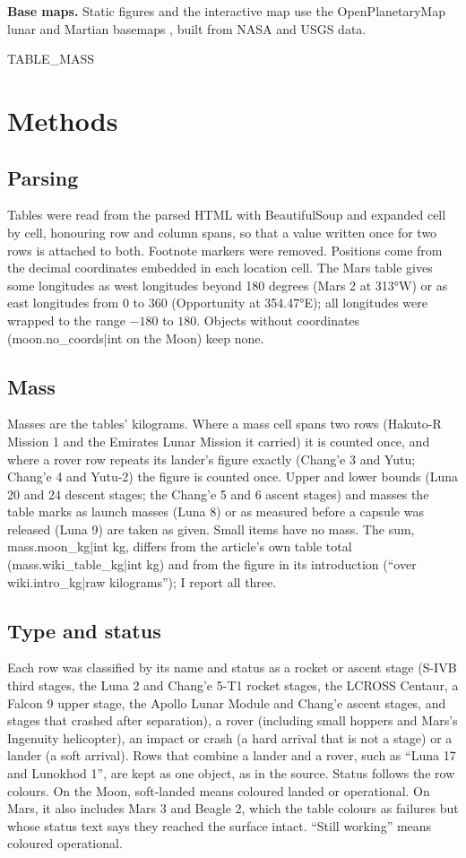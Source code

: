 \documentclass[11pt,a4paper]{article}
\begin{document}
\textbf{Base maps.} Static figures and the interactive map use the OpenPlanetaryMap lunar and Martian basemaps \citep{opm}, built from NASA and USGS data.

{{TABLE_MASS}}

\section{Methods}
\subsection{Parsing}
Tables were read from the parsed HTML with BeautifulSoup and expanded cell by cell, honouring row and column spans, so that a value written once for two rows is attached to both. Footnote markers were removed. Positions come from the decimal coordinates embedded in each location cell. The Mars table gives some longitudes as west longitudes beyond 180 degrees (Mars 2 at 313°W) or as east longitudes from 0 to 360 (Opportunity at 354.47°E); all longitudes were wrapped to the range $-180$ to $180$. Objects without coordinates ({{moon.no_coords|int}} on the Moon) keep none.

\subsection{Mass}
Masses are the tables' kilograms. Where a mass cell spans two rows (Hakuto-R Mission 1 and the Emirates Lunar Mission it carried) it is counted once, and where a rover row repeats its lander's figure exactly (Chang'e 3 and Yutu; Chang'e 4 and Yutu-2) the figure is counted once. Upper and lower bounds (Luna 20 and 24 descent stages; the Chang'e 5 and 6 ascent stages) and masses the table marks as launch masses (Luna 8) or as measured before a capsule was released (Luna 9) are taken as given. Small items have no mass. The sum, {{mass.moon_kg|int}} kg, differs from the article's own table total ({{mass.wiki_table_kg|int}} kg) and from the figure in its introduction (``over {{wiki.intro_kg|raw}} kilograms''); I report all three.

\subsection{Type and status}
Each row was classified by its name and status as a rocket or ascent stage (S-IVB third stages, the Luna 2 and Chang'e 5-T1 rocket stages, the LCROSS Centaur, a Falcon 9 upper stage, the Apollo Lunar Module and Chang'e ascent stages, and stages that crashed after separation), a rover (including small hoppers and Mars's Ingenuity helicopter), an impact or crash (a hard arrival that is not a stage) or a lander (a soft arrival). Rows that combine a lander and a rover, such as ``Luna 17 and Lunokhod 1'', are kept as one object, as in the source. Status follows the row colours. On the Moon, soft-landed means coloured landed or operational. On Mars, it also includes Mars 3 and Beagle 2, which the table colours as failures but whose status text says they reached the surface intact. ``Still working'' means coloured operational.
\end{document}

